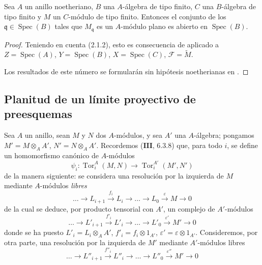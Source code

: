 \begin{corollary}[11.1.6]
\label{IV.11.1.6}
Sea $A$ un anillo noetheriano, $B$ una $A$-álgebra de tipo finito, $C$ una $B$-álgebra de tipo finito y $M$ un $C$-módulo de tipo finito. Entonces el conjunto de los $\mathfrak q\in\operatorname{Spec}(B)$ tales que $M_{\mathfrak q}$ es un $A$-módulo plano es abierto en $\operatorname{Spec}(B)$.
\end{corollary}

\begin{proof}
Teniendo en cuenta (2.1.2), esto es consecuencia de  aplicado a $Z=\operatorname{Spec}(A)$, $Y=\operatorname{Spec}(B)$, $X=\operatorname{Spec}(C)$, $\mathcal F=\widetilde M$.

Los resultados de este número se formularán sin hipótesis noetherianas en .
\end{proof}

\subsection{Planitud de un límite proyectivo de preesquemas}
\label{subsection:IV.11.2}



\begin{env}[11.2.1]
\label{IV.11.2.1}
Sea $A$ un anillo, sean $M$ y $N$ dos $A$-módulos, y sea $A'$ una $A$-álgebra; pongamos $M'=M\otimes_AA'$, $N'=N\otimes_AA'$. Recordemos ($\mathbf{III}$, 6.3.8) que, para todo $i$, se define un homomorfismo canónico de $A$-módulos
\begin{equation}
\psi_i:\operatorname{Tor}_i^A(M,N)\to\operatorname{Tor}_i^{A'}(M',N')
\label{IV.11.2.1.1-fr}
\tag{11.2.1.1}
\end{equation}
de la manera siguiente: se considera una resolución por la izquierda de $M$ mediante $A$-módulos \emph{libres}
\begin{equation}
\ldots\longrightarrow L_{i+1}\xrightarrow{f_i}L_i\longrightarrow\ldots
\longrightarrow L_0\xrightarrow{\varepsilon}M\longrightarrow0
\label{IV.11.2.1.2-fr}
\tag{11.2.1.2}
\end{equation}
de la cual se deduce, por producto tensorial con $A'$, un complejo de $A'$-módulos
\begin{equation}
\ldots\longrightarrow L'_{i+1}\xrightarrow{f'_i}L'_i\longrightarrow\ldots
\longrightarrow L'_0\xrightarrow{\varepsilon'}M'\longrightarrow0
\label{IV.11.2.1.3-fr}
\tag{11.2.1.3}
\end{equation}
donde se ha puesto $L'_i=L_i\otimes_AA'$, $f'_i=f_i\otimes1_{A'}$, $\varepsilon'=\varepsilon\otimes1_{A'}$. Consideremos, por otra parte, una resolución por la izquierda de $M'$ mediante $A'$-módulos libres
\begin{equation}
\ldots\longrightarrow L''_{i+1}\xrightarrow{f''_i}L''_i\longrightarrow\ldots
\longrightarrow L''_0\xrightarrow{\varepsilon''}M'\longrightarrow0
\label{IV.11.2.1.4-fr}
\tag{11.2.1.4}
\end{equation}
\end{env}


